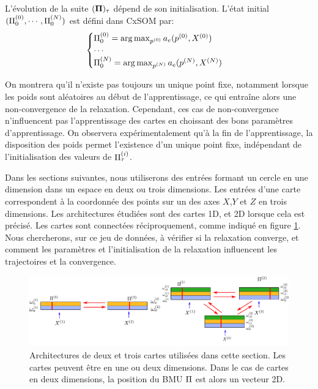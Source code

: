 L'évolution de la suite $(\mathbf{\Pi})_{\tau}$ dépend de son initialisation.
L'état initial $(\Pi^{({0})}_0, \cdots , \Pi^{({N})}_0)$ est défini dans CxSOM par: 
\begin{equation}
\begin{cases}
\Pi^{({0})}_0 = \operatorname*{arg\,max}_{p^{({0})}} a_e(p^{({0})},X^{({0})})\\
\cdots \\
\Pi^{({N})}_0 = \operatorname*{arg\,max}_{p^{({N})}} a_e(p^{({N})},X^{({N})})\\
\end{cases}
\label{eq:init}
\end{equation}

On montrera qu'il n'existe pas toujours un unique point fixe, notamment lorsque les poids sont aléatoires au début de l'apprentissage, ce qui entraîne alors une non-convergence de la relaxation. Cependant, ces cas de non-convergence n'influencent pas l'apprentissage des cartes en choissant des bons paramètres d'apprentissage. On observera expérimentalement qu'à la fin de l'apprentissage, la disposition des poids permet l'existence d'un unique point fixe, indépendant de l'initialisation des valeurs de $\Pi^{({i})}_{\tau}$.

Dans les sections suivantes, nous utiliserons des entrées formant un cercle en une dimension dans un espace en deux ou trois dimensions. Les entrées d'une carte correspondent à la coordonnée des points sur un des axes $X$,$Y$ et $Z$ en trois dimensions.
Les architectures étudiées sont des cartes 1D, et 2D lorsque cela est précisé. Les cartes sont connectées réciproquement, comme indiqué en figure \ref{fig:archis}.
Nous chercherons, sur ce jeu de données, à vérifier si la relaxation converge, et comment les paramètres et l'initialisation de la relaxation influencent les trajectoires et la convergence.
\begin{figure}
\centering
\includegraphics[width=\textwidth]{archis}
\caption{Architectures de deux et trois cartes utilisées dans cette section. Les cartes peuvent être en une ou deux dimensions. Dans le cas de cartes en deux dimensions, la position du BMU $\Pi$ est alors un vecteur 2D.}
\label{fig:archis}
\end{figure}

